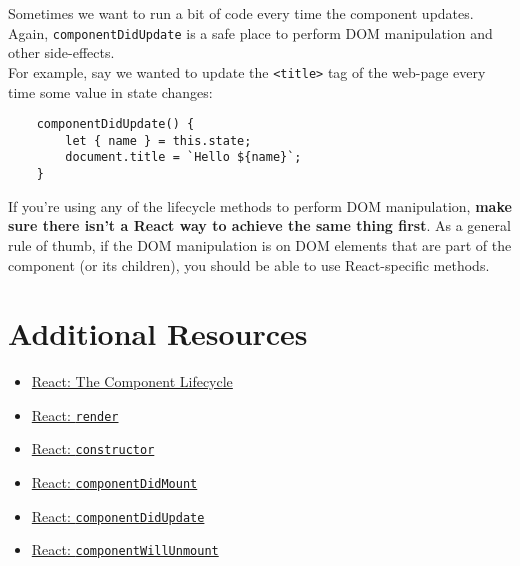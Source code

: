 Sometimes we want to run a bit of code every time the component updates.
\\

Again, \texttt{componentDidUpdate} is a safe place to perform DOM manipulation and other side-effects.
\\

For example, say we wanted to update the \texttt{<title>} tag of the web-page every time some value in state changes:

\begin{verbatim}
    componentDidUpdate() {
        let { name } = this.state;
        document.title = `Hello ${name}`;
    }
\end{verbatim}

\hr

If you're  using any of the lifecycle methods to perform DOM manipulation, \textbf{make sure there isn't a React way to achieve the same thing first}. As a general rule of thumb, if the DOM manipulation is on DOM elements that are part of the component (or its children), you should be able to use React-specific methods.



\section{Additional Resources}

\begin{itemize}[leftmargin=*]
    \item \href{https://reactjs.org/docs/react-component.html#the-component-lifecycle}{React: The Component Lifecycle}
    \item \href{https://reactjs.org/docs/react-component.html#render}{React: \texttt{render}}
    \item \href{https://reactjs.org/docs/react-component.html#constructor}{React: \texttt{constructor}}
    \item \href{https://reactjs.org/docs/react-component.html#componentdidmount}{React: \texttt{componentDidMount}}
    \item \href{https://reactjs.org/docs/react-component.html#componentdidupdate}{React: \texttt{componentDidUpdate}}
    \item \href{https://reactjs.org/docs/react-component.html#componentwillunmount}{React: \texttt{componentWillUnmount}}
\end{itemize}
